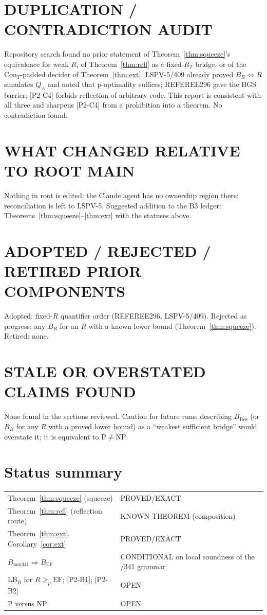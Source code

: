 \documentclass[11pt]{article}
\theoremstyle{definition}
\theoremstyle{remark}
\begin{document}
\section{DUPLICATION / CONTRADICTION AUDIT}
Repository search found no prior statement of Theorem~\ref{thm:squeeze}'s equivalence for weak $R$,
of Theorem~\ref{thm:refl} as a fixed-$R_T$ bridge, or of the $\mathrm{Con}_T$-padded decider of
Theorem~\ref{thm:ext}. LSPV-5/409 already proved $B_R\iff R$ simulates $Q_A$ and noted that
p-optimality suffices; REFEREE296 gave the BGS barrier; [P2-C4] forbids reflection of arbitrary code.
This report is consistent with all three and sharpens [P2-C4] from a prohibition into a theorem.
No contradiction found.

\section{WHAT CHANGED RELATIVE TO ROOT MAIN}
Nothing in root  is edited: the Claude agent has no ownership region there; reconciliation
is left to LSPV-5. Suggested addition to the B3 ledger: Theorems~\ref{thm:squeeze}--\ref{thm:ext}
with the statuses above.

\section{ADOPTED / REJECTED / RETIRED PRIOR COMPONENTS}
Adopted: fixed-$R$ quantifier order (REFEREE296, LSPV-5/409). Rejected as progress: any $B_R$ for an
$R$ with a known lower bound (Theorem~\ref{thm:squeeze}). Retired: none.

\section{STALE OR OVERSTATED CLAIMS FOUND}
None found in the sections reviewed. Caution for future runs: describing $B_{\mathrm{Res}}$ (or $B_R$
for any $R$ with a proved lower bound) as a ``weakest sufficient bridge'' would overstate it; it is
equivalent to $\mathrm P\ne\mathrm{NP}$.

\section{Status summary}
\begin{tabular}{ll}
Theorem~\ref{thm:squeeze} (squeeze) & PROVED/EXACT\\
Theorem~\ref{thm:refl} (reflection route) & KNOWN THEOREM (composition)\\
Theorem~\ref{thm:ext}, Corollary~\ref{cor:ext} & PROVED/EXACT\\
$B_{\mathrm{mix341}}\Rightarrow B_{\mathrm{EF}}$ & CONDITIONAL on local soundness of the /341 grammar\\
$\mathrm{LB}_R$ for $R\ge_p\mathrm{EF}$; [P2-B1]; [P2-B2] & OPEN\\
P versus NP & OPEN
\end{tabular}
\end{document}
